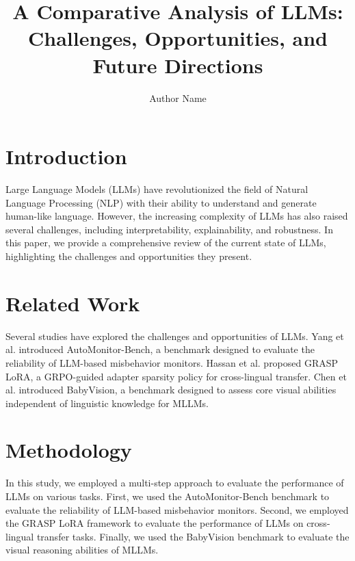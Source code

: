 \documentclass{article}
\begin{document}
\title{A Comparative Analysis of LLMs: Challenges, Opportunities, and Future Directions}

\author{Author Name}

\maketitle

\section{Introduction}
Large Language Models (LLMs) have revolutionized the field of Natural Language Processing (NLP) with their ability to understand and generate human-like language. However, the increasing complexity of LLMs has also raised several challenges, including interpretability, explainability, and robustness. In this paper, we provide a comprehensive review of the current state of LLMs, highlighting the challenges and opportunities they present.

\section{Related Work}

Several studies have explored the challenges and opportunities of LLMs. Yang et al. \cite{yang2026automonitorbenchevaluatingreliabilityllmbased} introduced AutoMonitor-Bench, a benchmark designed to evaluate the reliability of LLM-based misbehavior monitors. Hassan et al. \cite{hassan2026grasploragrpoguided} proposed GRASP LoRA, a GRPO-guided adapter sparsity policy for cross-lingual transfer. Chen et al. \cite{chen2026babyvisionvisualreasoninglanguage} introduced BabyVision, a benchmark designed to assess core visual abilities independent of linguistic knowledge for MLLMs.

\section{Methodology}

In this study, we employed a multi-step approach to evaluate the performance of LLMs on various tasks. First, we used the AutoMonitor-Bench benchmark to evaluate the reliability of LLM-based misbehavior monitors. Second, we employed the GRASP LoRA framework to evaluate the performance of LLMs on cross-lingual transfer tasks. Finally, we used the BabyVision benchmark to evaluate the visual reasoning abilities of MLLMs.
\end{document}
